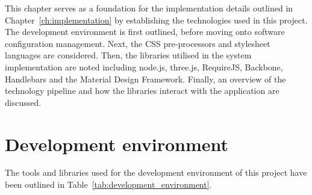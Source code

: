 
This chapter serves as a foundation for the implementation details outlined in Chapter~\ref{ch:implementation} by establishing the technologies used in this project. The development environment is first outlined, before moving onto software configuration management. Next, the CSS pre-processors and stylesheet languages are considered. Then, the libraries utilised in the system implementation are noted including node.js, three.js, RequireJS, Backbone, Handlebars and the Material Design Framework. Finally, an overview of the technology pipeline and how the libraries interact with the application are discussed.

\section{Development environment} {
\label{sec:development_environment}

	The tools and libraries used for the development environment of this project have been outlined in Table~\ref{tab:development_environment}.

	

}

